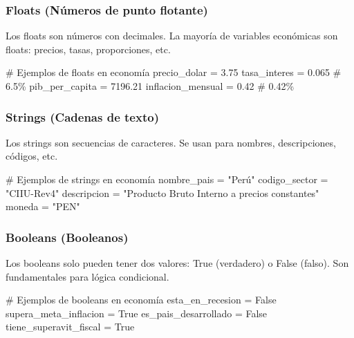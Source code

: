 \documentclass[
  doc,
  floatsintext,
  longtable,
  a4paper,
  nolmodern,
  notxfonts,
  notimes,
  12pt,
  colorlinks=true,linkcolor=blue,citecolor=blue,urlcolor=blue]{apa7}
\newenvironment{Shaded}{\begin{snugshade}}{\end{snugshade}}
\newcommand{\CommentTok}[1]{\textcolor[rgb]{0.37,0.37,0.37}{#1}}
\newcommand{\FloatTok}[1]{\textcolor[rgb]{0.68,0.00,0.00}{#1}}
\newcommand{\NormalTok}[1]{\textcolor[rgb]{0.00,0.23,0.31}{#1}}
\newcommand{\OperatorTok}[1]{\textcolor[rgb]{0.37,0.37,0.37}{#1}}
\newcommand{\StringTok}[1]{\textcolor[rgb]{0.13,0.47,0.30}{#1}}
\newcommand{\VariableTok}[1]{\textcolor[rgb]{0.07,0.07,0.07}{#1}}
\begin{document}
\subsubsection{Floats (Números de punto
flotante)}\label{floats-nuxfameros-de-punto-flotante}

Los floats son números con decimales. La mayoría de variables económicas
son floats: precios, tasas, proporciones, etc.

\begin{Shaded}
\begin{Highlighting}[]
\CommentTok{\# Ejemplos de floats en economía}
\NormalTok{precio\_dolar }\OperatorTok{=} \FloatTok{3.75}
\NormalTok{tasa\_interes }\OperatorTok{=} \FloatTok{0.065}  \CommentTok{\# 6.5\%}
\NormalTok{pib\_per\_capita }\OperatorTok{=} \FloatTok{7196.21}
\NormalTok{inflacion\_mensual }\OperatorTok{=} \FloatTok{0.42}  \CommentTok{\# 0.42\%}
\end{Highlighting}
\end{Shaded}

\subsubsection{Strings (Cadenas de
texto)}\label{strings-cadenas-de-texto}

Los strings son secuencias de caracteres. Se usan para nombres,
descripciones, códigos, etc.

\begin{Shaded}
\begin{Highlighting}[]
\CommentTok{\# Ejemplos de strings en economía}
\NormalTok{nombre\_pais }\OperatorTok{=} \StringTok{"Perú"}
\NormalTok{codigo\_sector }\OperatorTok{=} \StringTok{"CIIU{-}Rev4"}
\NormalTok{descripcion }\OperatorTok{=} \StringTok{"Producto Bruto Interno a precios constantes"}
\NormalTok{moneda }\OperatorTok{=} \StringTok{"PEN"}
\end{Highlighting}
\end{Shaded}

\subsubsection{Booleans (Booleanos)}\label{booleans-booleanos}

Los booleans solo pueden tener dos valores: True (verdadero) o False
(falso). Son fundamentales para lógica condicional.

\begin{Shaded}
\begin{Highlighting}[]
\CommentTok{\# Ejemplos de booleans en economía}
\NormalTok{esta\_en\_recesion }\OperatorTok{=} \VariableTok{False}
\NormalTok{supera\_meta\_inflacion }\OperatorTok{=} \VariableTok{True}
\NormalTok{es\_pais\_desarrollado }\OperatorTok{=} \VariableTok{False}
\NormalTok{tiene\_superavit\_fiscal }\OperatorTok{=} \VariableTok{True}
\end{Highlighting}
\end{Shaded}
\end{document}
